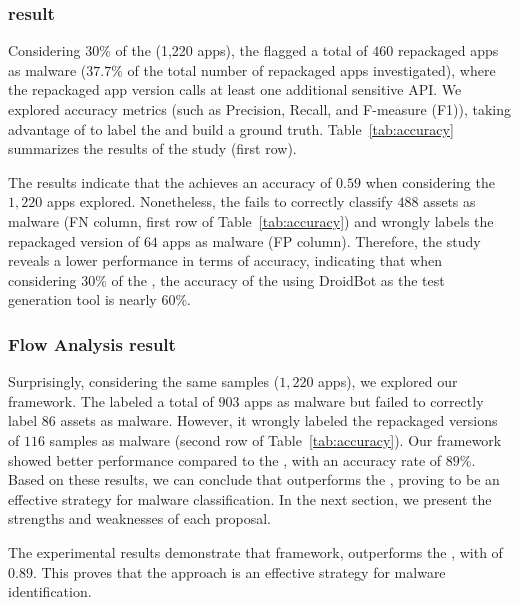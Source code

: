 \subsubsection{\mas result} 

Considering $30\%$ of the \fds (1,220 apps), the \mas flagged a total of $460$ repackaged apps as malware ($37.7\%$ of the total number of repackaged apps investigated), where the repackaged app version calls at least one additional sensitive API. We explored accuracy metrics (such as Precision, Recall, and F-measure (F1)), taking advantage of \vt to label the \fds and build a ground truth. Table~\ref{tab:accuracy} summarizes the results of the study (first row).

The results indicate that the \mas achieves an accuracy of $0.59$ when considering the $1,220$ apps explored. Nonetheless, the \mas fails to correctly classify $488$ assets as malware (FN column, first row of Table~\ref{tab:accuracy}) and wrongly labels the repackaged version of $64$ apps as malware (FP column). Therefore, the study reveals a lower performance in terms of accuracy, indicating that when considering $30\%$ of the \fds, the accuracy of the \mas using DroidBot as the test generation tool is nearly $60\%$.


\subsubsection{Flow Analysis result} 

Surprisingly, considering the same samples ($1,220$ apps), we explored our framework. The \droidxpflow labeled a total of $903$ apps as malware but failed to correctly label $86$ assets as malware. However, it wrongly labeled the repackaged versions of $116$ samples as malware (second row of Table~\ref{tab:accuracy}). Our \droidxpflow framework showed better performance compared to the \mas, with an accuracy rate of $89\%$. Based on these results, we can conclude that \droidxpflow outperforms the \mas, proving to be an effective strategy for malware classification. In the next section, we present the strengths and weaknesses of each proposal.


\begin{finding}
The experimental results demonstrate that \droidxpflow framework, outperforms the \mas, with \fone of $0.89$. This proves that the approach is an effective strategy for malware identification.
\end{finding}


\begin{table}
  \caption{Accuracy of both strategy on \fds (1220 samples).}
  \label{tab:accuracy}
\end{table}


